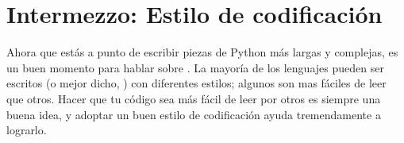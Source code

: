 \documentclass[a5paper,10pt,spanish]{sphinxmanual}
\begin{document}
\section{Intermezzo: Estilo de codificación}
\label{\detokenize{tutorial/controlflow:intermezzo-coding-style}}\label{\detokenize{tutorial/controlflow:tut-codingstyle}}
\ignorespaces 
\sphinxAtStartPar
Ahora que estás a punto de escribir piezas de Python más largas y complejas, es un buen momento para hablar sobre . La mayoría de los lenguajes pueden ser escritos (o mejor dicho, ) con diferentes estilos; algunos son mas fáciles de leer que otros. Hacer que tu código sea más fácil de leer por otros es siempre una buena idea, y adoptar un buen estilo de codificación ayuda tremendamente a lograrlo.
\end{document}
